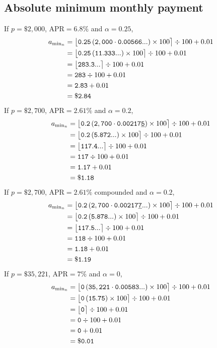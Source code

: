 \documentclass[12pt,letterpaper,oneside]{article}
\theoremstyle{remark} %
\begin{document}
	\subsection{Absolute minimum monthly payment}
	If $p=\$2,000$, $\mbox{APR}=6.8\%$ and $\alpha=0.25$,
	\begin{align*}
	a_{\rm{min_{\mathnormal{n}}}}&=\big\lfloor{\mathtt{0.25}\left(\mathtt{2,000}\cdot\mathtt{0.00566...}\right)\times 100}\big\rceil\div 100+0.01\\
	&=\big\lfloor{\mathtt{0.25}\left(\mathtt{11.333...}\right)\times 100}\big\rceil\div 100+0.01\\
	&=\big\lfloor{\mathtt{283.3...}}\big\rceil\div 100+0.01\\
	&=\mathtt{283}\div 100+0.01\\
	&=\mathtt{2.83}+0.01\\
	&=\mathtt{\$2.84}\\
	\end{align*}
	\newpage
	If $p=\$2,700$, $\mbox{APR}=2.61\%$ and $\alpha=0.2$,
	\begin{align*}
	a_{\rm{min_{\mathnormal{n}}}}&=\big\lfloor{\mathtt{0.2}\left(\mathtt{2,700}\cdot\mathtt{0.00217\underline{5}}\right)\times 100}\big\rceil\div 100+0.01\\
	&=\big\lfloor{\mathtt{0.2}\left(\mathtt{5.872...}\right)\times 100}\big\rceil\div 100+0.01\\
	&=\big\lfloor{\mathtt{117.4...}}\big\rceil\div 100+0.01\\
	&=\mathtt{117}\div 100+0.01\\
	&=\mathtt{1.17}+0.01\\
	&=\mathtt{\$1.18}\\
	\end{align*}
	If $p=\$2,700$, $\mbox{APR}=2.61\%$ compounded and $\alpha=0.2$,
	\begin{align*}
	a_{\rm{min_{\mathnormal{n}}}}&=\big\lfloor{\mathtt{0.2}\left(\mathtt{2,700}\cdot\mathtt{0.00217\underline{7}...}\right)\times 100}\big\rceil\div 100+0.01\\
	&=\big\lfloor{\mathtt{0.2}\left(\mathtt{5.878...}\right)\times 100}\big\rceil\div 100+0.01\\
	&=\big\lfloor{\mathtt{117.5...}}\big\rceil\div 100+0.01\\
	&=\mathtt{118}\div 100+0.01\\
	&=\mathtt{1.18}+0.01\\
	&=\mathtt{\$1.19}\\
	\end{align*}
	If $p=\$35,221$, $\mbox{APR}=7\%$ and $\alpha=0$,
	\begin{align*}
	a_{\rm{min_{\mathnormal{n}}}}&=\big\lfloor{\mathtt{0}\left(\mathtt{35,221}\cdot\mathtt{0.00583...}\right)\times 100}\big\rceil\div 100+0.01\\
	&=\big\lfloor{\mathtt{0}\left(\mathtt{15.75}\right)\times 100}\big\rceil\div 100+0.01\\
	&=\big\lfloor{\mathtt{0}}\big\rceil\div 100+0.01\\
	&=\mathtt{0}\div 100+0.01\\
	&=\mathtt{0}+0.01\\
	&=\mathtt{\$0.01}\\
	\end{align*}	
\end{document}
